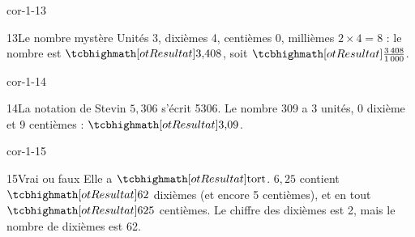 \begin{blocLivre}{cor-1-13}\begin{corrige}{13}{Le nombre mystère}
Unités 3, dixièmes 4, centièmes 0, millièmes $2\times4=8$ : le nombre est $\res{3{,}408}$, soit $\res{\frac{3\,408}{1\,000}}$.
\end{corrige}\end{blocLivre}
\begin{blocLivre}{cor-1-14}\begin{corrige}{14}{La notation de Stevin}
$5{,}306$ s’écrit 5306. Le nombre 309 a 3 unités, 0 dixième et 9 centièmes : $\res{3{,}09}$.
\end{corrige}\end{blocLivre}
\begin{blocLivre}{cor-1-15}\begin{corrige}{15}{Vrai ou faux}
Elle a $\res{\text{tort}}$. $6{,}25$ contient $\res{62}$ dixièmes (et encore 5 centièmes), et en tout $\res{625}$ centièmes. Le chiffre des dixièmes est 2, mais le nombre de dixièmes est 62.
\end{corrige}\end{blocLivre}
